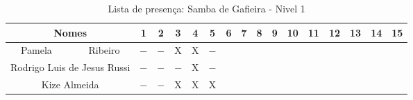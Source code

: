 \documentclass[a4paper,12pt]{article}
\begin{document}
\begin{landscape}
\begin{table}[!htbp]
\vspace*{-2cm}\centering
\caption{Lista de presença: Samba de Gafieira - Nivel 1}
\begin{tabular}{|*{16}{c|}}
\hline%
 Nomes & 1 & 2 & 3 & 4 & 5 & 6 & 7 & 8 & 9 & 10 & 11 & 12 & 13 & 14 & 15  \\ \hline
 \LARGE Pamela $~~~~~~~~~~~~~~$ Ribeiro  &$-$ &$-$ &X   &X   &$-$ &  &  &  &  &  &  &  &  &  &  \\ \hline
 \LARGE Rodrigo Luis de Jesus Russi      &$-$ &$-$ &$-$ &X   &$-$ &  &  &  &  &  &  &  &  &  &  \\ \hline
 \LARGE Kize Almeida                     &$-$ &$-$ &X   &X   &X   &  &  &  &  &  &  &  &  &  &  \\ \hline
 \hline
\end{tabular}
\label{actividades2}
\end{table}

\end{landscape}
\end{document}
